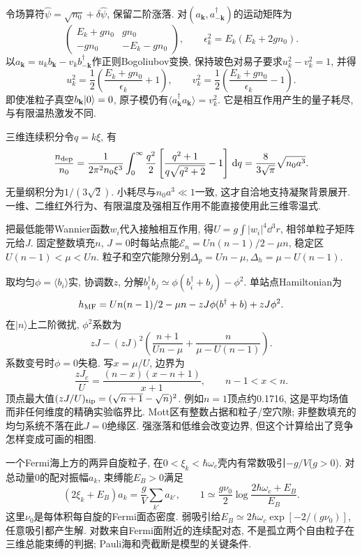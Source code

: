 令场算符$\hat\psi=\sqrt{n_0}+\delta\hat\psi$, 保留二阶涨落. 对$(a_{\mathbf k},a_{-\mathbf k}^\dagger)$的运动矩阵为
\[\begin{pmatrix}E_k+gn_0&gn_0\\-gn_0&-E_k-gn_0\end{pmatrix},\qquad
 \epsilon_k^2=E_k(E_k+2gn_0).\]
以$a_{\mathbf k}=u_kb_{\mathbf k}-v_kb_{-\mathbf k}^\dagger$作正则Bogoliubov变换, 保持玻色对易子要求$u_k^2-v_k^2=1$, 并得
\[u_k^2=\frac12\left(\frac{E_k+gn_0}{\epsilon_k}+1\right),\qquad
 v_k^2=\frac12\left(\frac{E_k+gn_0}{\epsilon_k}-1\right).\]
即使准粒子真空$b_{\mathbf k}\lvert 0\rangle=0$, 原子模仍有$\langle a_{\mathbf k}^\dagger a_{\mathbf k}\rangle=v_k^2$. 它是相互作用产生的量子耗尽, 与有限温热激发不同.

三维连续积分令$q=k\xi$, 有
\[\frac{n_{\rm dep}}{n_0}
 =\frac1{2\pi^2n_0\xi^3}\int_0^\infty
 \frac{q^2}{2}\left[\frac{q^2+1}{q\sqrt{q^2+2}}-1\right]\,\mathrm d q
 =\frac8{3\sqrt\pi}\sqrt{n_0a^3}.\]
无量纲积分为$1/(3\sqrt2)$. 小耗尽与$n_0a^3\ll1$一致, 这才自洽地支持凝聚背景展开. 一维、二维红外行为、有限温度及强相互作用不能直接使用此三维零温式.

把最低能带Wannier函数$w_i$代入接触相互作用, 得$U=g\int|w_i|^4\dd^3r$, 相邻单粒子矩阵元给$J$. 固定整数填充$n$, $J=0$时每站点能$\mathcal E_n=Un(n-1)/2-\mu n$, 稳定区$U(n-1)<\mu<Un$. 粒子和空穴能隙分别$\Delta_p=Un-\mu,\Delta_h=\mu-U(n-1)$.

取均匀$\phi=\langle b_i\rangle$实, 协调数$z$, 分解$b_i^\dagger b_j\simeq\phi(b_i^\dagger+b_j)-\phi^2$. 单站点Hamiltonian为
\[h_{\rm MF}=Un(n-1)/2-\mu n-zJ\phi(b^\dagger+b)+zJ\phi^2.\]
在$|n\rangle$上二阶微扰, $\phi^2$系数为
\[zJ-(zJ)^2\left(\frac{n+1}{Un-\mu}
                         +\frac n{\mu-U(n-1)}\right).\]
系数变号时$\phi=0$失稳. 写$x=\mu/U$, 边界为
\[\frac{zJ_c}U=\frac{(n-x)(x-n+1)}{x+1},\qquad n-1<x<n.\]
顶点最大值$(zJ/U)_{\rm tip}=(\sqrt{n+1}-\sqrt n)^2$. 例如$n=1$顶点约0.1716, 这是平均场值而非任何维度的精确实验临界比. Mott区有整数占据和粒子/空穴隙; 非整数填充的均匀系统不落在此$J=0$绝缘区. 强涨落和低维会改变边界, 但这个计算给出了竞争怎样变成可画的相图.

一个Fermi海上方的两异自旋粒子, 在$0<\xi_k<\hbar\omega_c$壳内有常数吸引$-g/V$($g>0$). 对总动量0的配对振幅$a_k$, 束缚能$E_B>0$满足
\[(2\xi_k+E_B)a_k=\frac gV\sum_{k'}a_{k'},\qquad
 1\simeq\frac{g\nu_0}{2}\log\frac{2\hbar\omega_c+E_B}{E_B}.\]
这里$\nu_0$是每体积每自旋的Fermi面态密度. 弱吸引给$E_B\simeq2\hbar\omega_c\exp[-2/(g\nu_0)]$, 任意吸引都产生解. 对数来自Fermi面附近的连续配对态, 不是孤立两个自由粒子在三维总能束缚的判据; Pauli海和壳截断是模型的关键条件.

